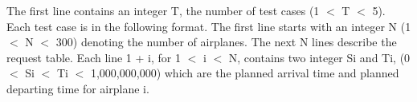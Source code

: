 The first line contains an integer T, the number of test cases (1 $<$ T $<$ 5). Each test case is in the following format. The first line starts with an integer N (1 $<$ N $<$ 300) denoting the number of airplanes. The next
N lines describe the request table. Each line 1 + i, for 1 $<$ i $<$ N, contains two integer Si and Ti, (0 $<$ Si $<$ Ti $<$ 1,000,000,000) which are the planned arrival time and planned departing time for airplane i.